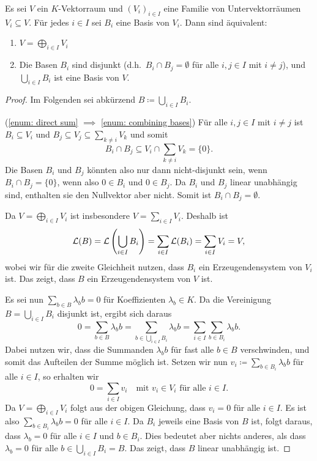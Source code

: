 \documentclass[a4paper,10pt]{scrartcl}
\begin{document}
\begin{lemma}
  Es sei $V$ ein $K$-Vektorraum und $(V_i)_{i \in I}$ eine Familie von Untervektorräumen $V_i \subseteq V$.
  Für jedes $i \in I$ sei $B_i$ eine Basis von $V_i$.
  Dann sind äquivalent:
  \begin{enumerate}
    \item\label{enum: direct sum}
      $V = \bigoplus_{i \in I} V_i$
    \item\label{enum: combining bases} 
      Die Basen $B_i$ sind disjunkt (d.h.\ $B_i \cap B_j = \emptyset$ für alle $i,j \in I$ mit $i \neq j$), und $\bigcup_{i \in I} B_i$ ist eine Basis von $V$. 
  \end{enumerate}
\end{lemma}


\begin{proof}
  Im Folgenden sei abkürzend $B \coloneqq \bigcup_{i \in I} B_i$.

  (\ref{enum: direct sum} $\implies$ \ref{enum: combining bases})
  Für alle $i,j \in I$ mit $i \neq j$ ist $B_i \subseteq V_i$ und $B_j \subseteq V_j \subseteq \sum_{k \neq i} V_k$ und somit
  \[
              B_i \cap B_j
    \subseteq V_i \cap \sum_{k \neq i} V_k
    =         \{0\}.
  \]
  Die Basen $B_i$ und $B_j$ könnten also nur dann nicht-disjunkt sein, wenn $B_i \cap B_j = \{0\}$, wenn also $0 \in B_i$ und $0 \in B_j$.
  Da $B_i$ und $B_j$ linear unabhängig sind, enthalten sie den Nullvektor aber nicht.
  Somit ist $B_i \cap B_j = \emptyset$.
  
  Da $V = \bigoplus_{i \in I} V_i$ ist insbesondere $V = \sum_{i \in I} V_i$.
  Deshalb ist
  \[
      \operatorname{\mathcal{L}}(B)
    = \operatorname{\mathcal{L}}\left( \bigcup_{i \in I} B_i \right)
    = \sum_{i \in I} \operatorname{\mathcal{L}}(B_i)
    = \sum_{i \in I} V_i
    = V,
  \]
  wobei wir für die zweite Gleichheit nutzen, dass $B_i$ ein Erzeugendensystem von $V_i$ ist.
  Das zeigt, dass $B$ ein Erzeugendensystem von $V$ ist.
  
  Es sei nun $\sum_{b \in B} \lambda_b b = 0$ für Koeffizienten $\lambda_b \in K$.
  Da die Vereinigung $B = \bigcup_{i \in I} B_i$ disjunkt ist, ergibt sich daraus
  \[
      0
    = \sum_{b \in B} \lambda_b b
    = \sum_{b \in \bigcup_{i \in I} B_i} \lambda_b b
    = \sum_{i \in I} \sum_{b \in B_i} \lambda_b b.
  \]
  Dabei nutzen wir, dass die Summanden $\lambda_b b$ für fast alle $b \in B$ verschwinden, und somit das Aufteilen der Summe möglich ist.
  Setzen wir nun $v_i \coloneqq \sum_{b \in B_i} \lambda_b b$ für alle $i \in I$, so erhalten wir
  \[
    0 = \sum_{i \in I} v_i
    \quad
    \text{mit $v_i \in V_i$ für alle $i \in I$}.
  \]
  Da $V = \bigoplus_{i \in I} V_i$ folgt aus der obigen Gleichung, dass $v_i = 0$ für alle $i \in I$.
  Es ist also $\sum_{b \in B_i} \lambda_b b = 0$ für alle $i \in I$.
  Da $B_i$ jeweils eine Basis von $B$ ist, folgt daraus, dass $\lambda_b = 0$ für alle $i \in I$ und $b \in B_i$.
  Dies bedeutet aber nichts anderes, als dass $\lambda_b = 0$ für alle $b \in \bigcup_{i \in I} B_i = B$.
  Das zeigt, dass $B$ linear unabhängig ist.
\end{proof}
\end{document}
